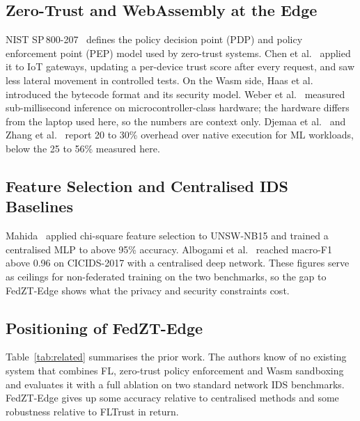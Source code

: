 \documentclass[iicol,Numbered]{sn-jnl}
\begin{document}
\subsection{Zero-Trust and WebAssembly at the Edge}

NIST SP\,800-207~\cite{nist2020} defines the policy decision point (PDP) and
policy enforcement point (PEP) model used by zero-trust systems. Chen et
al.~\cite{chen2021zero} applied it to IoT gateways, updating a per-device trust
score after every request, and saw less lateral movement in controlled tests.
On the Wasm side, Haas et al.~\cite{haas2017wasm} introduced the bytecode format
and its security model. Weber et al.~\cite{weber2024} measured sub-millisecond
inference on microcontroller-class hardware; the hardware differs from the
laptop used here, so the numbers are context only. Djemaa et
al.~\cite{djemaa2022} and Zhang et al.~\cite{zhang2023} report 20 to 30\%
overhead over native execution for ML workloads, below the 25 to 56\% measured
here.

\subsection{Feature Selection and Centralised IDS Baselines}

Mahida~\cite{mahida2022} applied chi-square feature selection to UNSW-NB15 and
trained a centralised MLP to above 95\% accuracy. Albogami et
al.~\cite{albogami2023} reached macro-F1 above 0.96 on CICIDS-2017 with a
centralised deep network. These figures serve as ceilings for non-federated
training on the two benchmarks, so the gap to FedZT-Edge shows what the privacy
and security constraints cost.

\subsection{Positioning of FedZT-Edge}

Table~\ref{tab:related} summarises the prior work. The authors know of no
existing system that combines FL, zero-trust policy enforcement and Wasm
sandboxing and evaluates it with a full ablation on two standard network IDS
benchmarks. FedZT-Edge gives up some accuracy relative to centralised methods
and some robustness relative to FLTrust in return.
\end{document}
